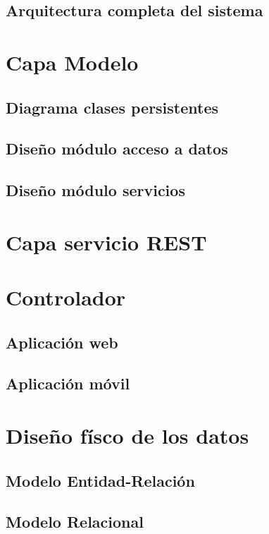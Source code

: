 \subsection{Arquitectura completa del sistema}



\section{Capa Modelo}
\subsection{Diagrama clases persistentes}
\subsection{Diseño módulo acceso a datos}
\subsection{Diseño módulo servicios}
\section{Capa servicio REST}
\section{Controlador}
\subsection{Aplicación web}
\subsection{Aplicación móvil}

\section{Diseño físco de los datos}
\subsection{Modelo Entidad-Relación}
\subsection{Modelo Relacional}






